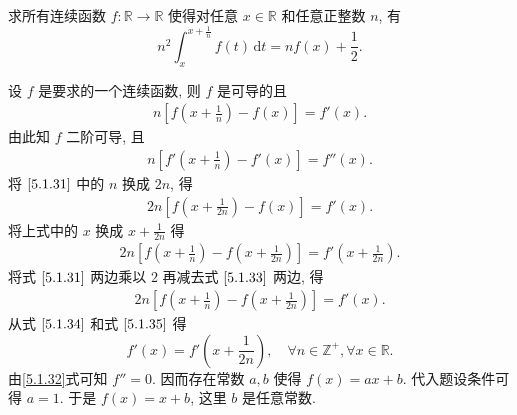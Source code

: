 \documentclass[../../main.tex]{subfiles}
\begin{document}
\begin{example}
求所有连续函数 \( f : \mathbb{R} \to \mathbb{R} \) 使得对任意 \( x \in \mathbb{R} \) 和任意正整数 \( n \), 有  
\[
n^2 \int_{x}^{x + \frac{1}{n}} f(t) \, \mathrm{d}t = n f(x) + \frac{1}{2}.
\]  
\end{example}
\begin{solution}
设 \( f \) 是要求的一个连续函数, 则 \( f \) 是可导的且  
\begin{align}
n \left[ f \left( x + \frac{1}{n} \right) - f(x) \right] = f'(x). \label{5.1.31}
\end{align}  
由此知 \( f \) 二阶可导, 且  
\begin{align}
n \left[ f' \left( x + \frac{1}{n} \right) - f'(x) \right] = f''(x). \label{5.1.32}
\end{align}  
将 \(\eqref{5.1.31}\) 中的 \( n \) 换成 \( 2n \), 得  
\begin{align}
2n \left[ f \left( x + \frac{1}{2n} \right) - f(x) \right] = f'(x). \label{5.1.33}
\end{align}  
将上式中的 \( x \) 换成 \( x + \frac{1}{2n} \) 得  
\begin{align}
2n \left[ f \left( x + \frac{1}{n} \right) - f \left( x + \frac{1}{2n} \right) \right] = f' \left( x + \frac{1}{2n} \right). \label{5.1.34}
\end{align}  
将式 \(\eqref{5.1.31}\) 两边乘以 \( 2 \) 再减去式 \(\eqref{5.1.33}\) 两边, 得  
\begin{align}
2n \left[ f \left( x + \frac{1}{n} \right) - f \left( x + \frac{1}{2n} \right) \right] = f'(x). \label{5.1.35}
\end{align}  
从式 \(\eqref{5.1.34}\) 和式 \(\eqref{5.1.35}\) 得  
\[
f'(x) = f' \left( x + \frac{1}{2n} \right), \quad \forall n \in \mathbb{Z}^+, \forall x \in \mathbb{R}.
\]  
由\eqref{5.1.32}式可知 \( f'' = 0 \). 因而存在常数 \( a, b \) 使得 \( f(x) = ax + b \). 代入题设条件可得 \( a = 1 \). 于是 \( f(x) = x + b \), 这里 \( b \) 是任意常数.
\end{solution}
\end{document}
